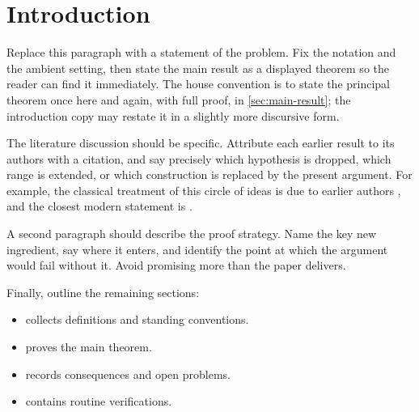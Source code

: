 
\section{Introduction}
\label{sec:introduction}

Replace this paragraph with a statement of the problem. Fix the
notation and the ambient setting, then state the main result as a
displayed theorem so the reader can find it immediately. The house
convention is to state the principal theorem once here and again,
with full proof, in \cref{sec:main-result}; the introduction copy may
restate it in a slightly more discursive form.

The literature discussion should be specific. Attribute each earlier
result to its authors with a citation, and say precisely which
hypothesis is dropped, which range is extended, or which construction
is replaced by the present argument. For example, the classical
treatment of this circle of ideas is due to earlier authors
\cite{example-classical}, and the closest modern statement is
\cite{example-modern}.

A second paragraph should describe the proof strategy. Name the key
new ingredient, say where it enters, and identify the point at which
the argument would fail without it. Avoid promising more than the
paper delivers.

Finally, outline the remaining sections:
\begin{itemize}
  \item {} collects definitions and standing
        conventions.
  \item {} proves the main theorem.
  \item {} records consequences and open problems.
  \item {} contains routine verifications.
\end{itemize}
